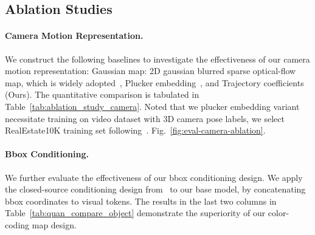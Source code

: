 
\subsection{Ablation Studies}

\paragraph{\textbf{Camera Motion Representation.}} We construct the following baselines to investigate the effectiveness of our camera motion representation: Gaussian map: 2D gaussian blurred sparse optical-flow map, which is widely adopted~\cite{wang2024motionctrl,wu2025draganything,mou2024revideo}, Plucker embedding~\cite{he2024cameractrl,xu2024camco,bahmani2024vd3d}, and Trajectory coefficients (Ours). The quantitative comparison is tabulated in Table~\ref{tab:ablation_study_camera}. Noted that we plucker embedding variant necessitate training on video dataset with 3D camera pose labels, we select RealEstate10K training set following~\cite{wang2024motionctrl,he2024cameractrl}. Fig.~\ref{fig:eval-camera-ablation}.

\paragraph{\textbf{Bbox Conditioning.}}
We further evaluate the effectiveness of our bbox conditioning design. We apply the closed-source conditioning design from~\cite{wangboximator} to our base model, by concatenating bbox coordinates to visual tokens. The results in the last two columns in Table~\ref{tab:quan_compare_object} demonstrate the superiority of our color-coding map design.



